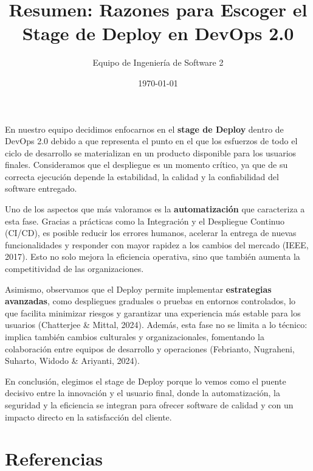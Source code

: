\documentclass[12pt,a4paper]{article}
\title{Resumen: Razones para Escoger el Stage de Deploy en DevOps 2.0}
\author{Equipo de Ingeniería de Software 2}
\date{\today}
\begin{document}
\maketitle

En nuestro equipo decidimos enfocarnos en el \textbf{stage de Deploy} dentro de DevOps 2.0 debido a que representa el punto en el que los esfuerzos de todo el ciclo de desarrollo se materializan en un producto disponible para los usuarios finales. Consideramos que el despliegue es un momento crítico, ya que de su correcta ejecución depende la estabilidad, la calidad y la confiabilidad del software entregado.  

Uno de los aspectos que más valoramos es la \textbf{automatización} que caracteriza a esta fase. Gracias a prácticas como la Integración y el Despliegue Continuo (CI/CD), es posible reducir los errores humanos, acelerar la entrega de nuevas funcionalidades y responder con mayor rapidez a los cambios del mercado (IEEE, 2017). Esto no solo mejora la eficiencia operativa, sino que también aumenta la competitividad de las organizaciones.  

Asimismo, observamos que el Deploy permite implementar \textbf{estrategias avanzadas}, como despliegues graduales o pruebas en entornos controlados, lo que facilita minimizar riesgos y garantizar una experiencia más estable para los usuarios (Chatterjee \& Mittal, 2024). Además, esta fase no se limita a lo técnico: implica también cambios culturales y organizacionales, fomentando la colaboración entre equipos de desarrollo y operaciones (Febrianto, Nugraheni, Suharto, Widodo \& Ariyanti, 2024).  

En conclusión, elegimos el stage de Deploy porque lo vemos como el puente decisivo entre la innovación y el usuario final, donde la automatización, la seguridad y la eficiencia se integran para ofrecer software de calidad y con un impacto directo en la satisfacción del cliente.

\section*{Referencias}
\end{document}
